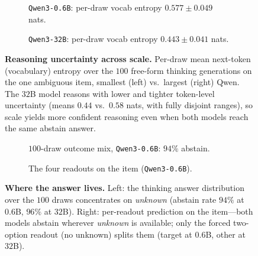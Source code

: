 \begin{figure}[htbp]\centering
  \begin{subfigure}{0.49\linewidth}\centering
    \caption{\texttt{Qwen3-0.6B}: per-draw vocab entropy $0.577 \pm 0.049$ nats.}
    \label{fig:divergence-entropy-small}
  \end{subfigure}\hfill
  \begin{subfigure}{0.49\linewidth}\centering
    \caption{\texttt{Qwen3-32B}: per-draw vocab entropy $0.443 \pm 0.041$ nats.}
    \label{fig:divergence-entropy-large}
  \end{subfigure}
  \caption{\textbf{Reasoning uncertainty across scale.} Per-draw mean next-token
    (vocabulary) entropy over the $100$ free-form thinking generations on the one
    ambiguous item, smallest (left) vs.\ largest (right) Qwen. The $32$B model
    reasons with lower and tighter token-level uncertainty (means $0.44$ vs.\
    $0.58$ nats, with fully disjoint ranges), so scale yields more confident
    reasoning even when both models reach the same abstain answer.}
  \label{fig:divergence-entropy}
\end{figure}

\begin{figure}[htbp]\centering
  \begin{subfigure}{0.49\linewidth}\centering
    \caption{$100$-draw outcome mix, \texttt{Qwen3-0.6B}: $94\%$ abstain.}
    \label{fig:divergence-outcome-small}
  \end{subfigure}\hfill
  \begin{subfigure}{0.49\linewidth}\centering
    \caption{The four readouts on the item (\texttt{Qwen3-0.6B}).}
    \label{fig:divergence-readouts}
  \end{subfigure}
  \caption{\textbf{Where the answer lives.} Left: the thinking answer
    distribution over the $100$ draws concentrates on \emph{unknown}
    (abstain rate $94\%$ at $0.6$B, $96\%$ at $32$B). Right: per-readout
    prediction on the item---both models abstain wherever \emph{unknown} is
    available; only the forced two-option readout (no unknown) splits them
    (target at $0.6$B, other at $32$B).}
  \label{fig:divergence-answer}
\end{figure}
